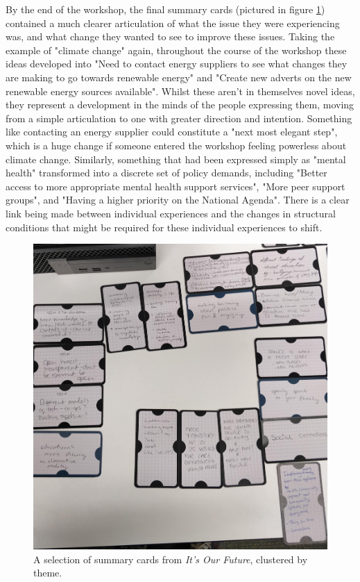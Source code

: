 By  the end of the workshop, the final summary cards (pictured in figure \ref{fig:summary-cards-eg}) contained a much clearer articulation of what the issue they were experiencing was, and what change they wanted to see to improve these issues. Taking the example of "climate change" again, throughout the course of the workshop these ideas developed into "Need to contact energy suppliers to see what changes they are making to go towards renewable energy" and "Create new adverts on the new renewable energy sources available". Whilst these aren't in themselves novel ideas, they represent a development in the minds of the people expressing them, moving from a simple articulation to one with greater direction and intention. Something like contacting an energy supplier could constitute a "next most elegant step", which is a huge change if someone entered the workshop feeling powerless about climate change. Similarly, something that had been expressed simply as "mental health" transformed into a discrete set of policy demands, including "Better access to more appropriate mental health support services", "More peer support groups", and "Having a higher priority on the National Agenda". There is a clear link being made between individual experiences and the changes in structural conditions that might be required for these individual experiences to shift. 

\begin{figure}
    \centering
    \includegraphics[width=1\linewidth]{Images/7/summary-cards-eg.jpg}
    \caption{A selection of summary cards from \textit{It's Our Future}, clustered by theme.}
    \label{fig:summary-cards-eg}
\end{figure}

